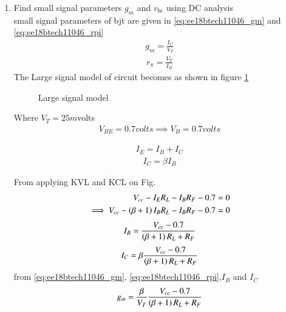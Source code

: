 \begin{enumerate}[label=\arabic*.,ref=\theenumi]
%


\item Find small signal parameters 
 $g_{m}$ and $v_{be}$ using DC analysis
\\
%
\solution
small signal parameters of bjt are given in
\eqref{eq:ee18btech11046_gm} and \eqref{eq:ee18btech11046_rpi}
\begin{align}
g_{m} = \frac{I_{C}}{V_{T}}
\label{eq:ee18btech11046_gm}
\end{align}
\begin{align}
r_{\pi} = \frac{V_{T}}{I_{B}}
\label{eq:ee18btech11046_rpi}
\end{align}
The Large signal model of circuit becomes as shown in figure \ref{fig:ee18btech11046_largeSig}
\begin{figure}[ht!]
	\begin{center}
		\resizebox{\columnwidth}{!}{}
	\end{center}
	\caption{Large signal model}
	\label{fig:ee18btech11046_largeSig}
\end{figure}
\renewcommand{\thefigure}{\theenumi}


Where $V_{T} = 25m$volts
\begin{align}
V_{BE} = 0.7 volts 
\implies
V_{B} = 0.7 volts
\end{align}

\begin{align}
I_{E} = I_{B} + I_{C}
\end{align}
\begin{align}
I_{C} = \beta I_{B}
\end{align}

From applying KVL and KCL on Fig.
\begin{align}
V_{cc} - I_{E}R_{L} - I_{B}R_{F} - 0.7 = 0
\\
\implies
V_{cc} - \left(\beta+1\right)I_{B}R_{L} - I_{B}R_{F} - 0.7 = 0
\end{align}
\begin{align}
I_{B} = \frac{V_{cc}-0.7}{\left(\beta+1\right)R_{L}+R_{F}}
\label{eq:ee18btech11046_IB}
\end{align}
\begin{align}
I_{C} = \beta \frac{V_{cc}-0.7}{\left(\beta+1\right)R_{L}+R_{F}}
\label{eq:ee18btech11046_IC}
\end{align}
from \eqref{eq:ee18btech11046_gm}, \eqref{eq:ee18btech11046_rpi},$I_{B}$ and $I_{C}$
\begin{align}
g_{m} = \frac{\beta}{V_{T}}\frac{V_{cc}-0.7}{\left(\beta+1\right)R_{L}+R_{F}}
\label{eq:ee18btech11046_gmval}
\end{align}


\end{enumerate}
